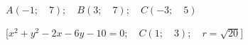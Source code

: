 \begin{esercizio}
\begin{enumeratea}
  \item  \(A \left (-1; \quad 7 \right ); \quad B \left (3; \quad 7 \right ); 
\quad C \left (-3; \quad 5 \right )\)

   \hfill [\(x^2 + y^2 -2x -6y -10 = 0; \quad C \left (1; \quad 3 \right ); 
\quad r = \sqrt{20}\)]

% 
% 
% 
 \end{enumeratea}
\end{esercizio}





